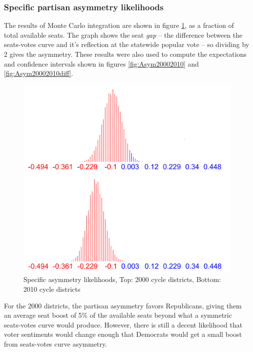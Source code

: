 \documentclass[preprint,12pt]{article}
\begin{document}
\subsubsection{Specific partisan asymmetry likelihoods}
 
The results of Monte Carlo integration are shown in figure \ref{fig:LikelihoodsAsymmetry}, as a fraction of total available seats.  
The graph shows the seat \emph{gap} -- the difference between the seats-votes curve and it's reflection at the statewide popular vote -- so dividing by 2 gives the asymmetry.
These results were also used to compute the expectations and confidence intervals shown in figures \ref{fig:Asym20002010} and \ref{fig:Asym20002010diff}.
 
\begin{figure}[htb!]
    \begin{center}
        \includegraphics[scale=0.25]{../Figures/WI_compared/asymmetry_cropped.png}
        \caption{Specific asymmetry likelihoods, Top: 2000 cycle districts, Bottom: 2010 cycle districts}\label{fig:LikelihoodsAsymmetry}
    \end{center}
\end{figure}
 
For the 2000 districts, the partisan asymmetry favors Republicans, giving them an average seat boost of 5\% of the available seats beyond what a symmetric seats-votes curve would produce.  
However, there is still a decent likelihood that voter sentiments would change enough that Democrats would get a small boost from seats-votes curve asymmetry.
\end{document}
